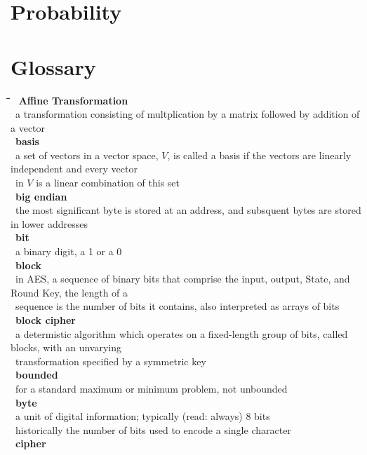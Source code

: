 \documentclass[10pt,letterpaper]{scrartcl}
\newcommand{\tbul}{\textbullet}
\newcommand{\tend}{\>\textendash}
\newcommand{\tabDef}{\hspace{2em}\=\hspace{2em}\=\hspace{2em}\=\hspace{2em}\=\kill}
\begin{document}
\newpage\section{Probability}

\newpage\section{Glossary}\begin{tabbing}\tabDef 
\tbul\ \textbf{Affine Transformation} \\
    \tend\ a transformation consisting of multplication by a matrix followed by addition of a vector \\
\tbul\ \textbf{basis} \\
    \tend\ a set of vectors in a vector space, $V$, is called a basis if the vectors are linearly independent and every vector \\ \>\ in $V$ is a linear combination of this set \\
\tbul\ \textbf{big endian} \\
    \tend\ the most significant byte is stored at an address, and subsquent bytes are stored in lower addresses\\
\tbul\ \textbf{bit} \\
    \tend\ a binary digit, a 1 or a 0 \\
\tbul\ \textbf{block} \\
    \tend\ in AES, a sequence of binary bits that comprise the input, output, State, and Round Key, the length of a \\ \>\ sequence is the number of bits it contains, also interpreted as arrays of bits \\
\tbul\ \textbf{block cipher} \\
    \tend\ a determistic algorithm which operates on a fixed-length group of bits, called blocks, with an unvarying \\ \>\ transformation specified by a symmetric key \\
\tbul\ \textbf{bounded} \\
    \tend\ for a standard maximum or minimum problem, not unbounded \\
\tbul\ \textbf{byte} \\
    \tend\ a unit of digital information; typically (read: always) 8 bits \\
    \tend\ historically the number of bits used to encode a single character \\
\tbul\ \textbf{cipher} \\

\end{tabbing}
\end{document}

